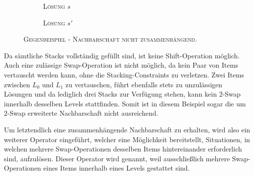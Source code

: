 \begin{figure}[H]
  \begin{subfigure}[b]{0.5\textwidth}
  \centering
    \caption{\textsc{Lösung $s$}}
    \label{fig:c_2_a}
  \end{subfigure}
  \hfill
  \begin{subfigure}[b]{0.5\textwidth}
  \centering
    \caption{\textsc{Lösung $s'$}}
    \label{fig:c_2_b}
  \end{subfigure}
  \caption{\textsc{Gegenbeispiel - Nachbarschaft nicht zusammenhängend.}}
  \label{fig:c_2_stacks}
\end{figure}

Da sämtliche Stacks vollständig gefüllt sind, ist keine Shift-Operation möglich.
Auch eine zulässige Swap-Operation ist nicht möglich, da kein Paar von Items vertauscht werden kann, ohne die
Stacking-Constraints zu verletzen. Zwei Items zwischen $L_0$ und $L_1$ zu vertauschen, führt ebenfalls stets
zu unzulässigen Lösungen und da lediglich drei Stacks zur Verfügung stehen, kann kein $2$-Swap innerhalb desselben
Levels stattfinden. Somit ist in diesem Beispiel sogar die um $2$-Swap erweiterte Nachbarschaft nicht ausreichend.

Um letztendlich eine zusammenhängende Nachbarschaft zu erhalten, wird also ein weiterer Operator eingeführt,
welcher eine Möglichkeit bereitstellt, Situationen, in welchen mehrere Swap-Operationen desselben Items
hintereinander erforderlich sind, aufzulösen.
Dieser Operator wird  genannt, weil ausschließlich mehrere Swap-Operationen eines Items innerhalb
eines Levels gestattet sind.

